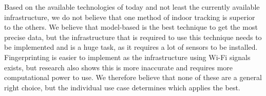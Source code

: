 Based on the available technologies of today and not least the currently available infrastructure, we do not believe that one method of indoor tracking is superior to the others.
We believe that model-based is the best technique to get the most precise data, but the infrastructure that is required to use this technique needs to be implemented and is a huge task, as it requires a lot of sensors to be installed. 
Fingerprinting is easier to implement as the infrastructure using Wi-Fi signals exists, but research also shows this is more inaccurate and requires more computational power to use. 
We therefore believe that none of these are a general right choice, but the individual use case determines which applies the best. 
